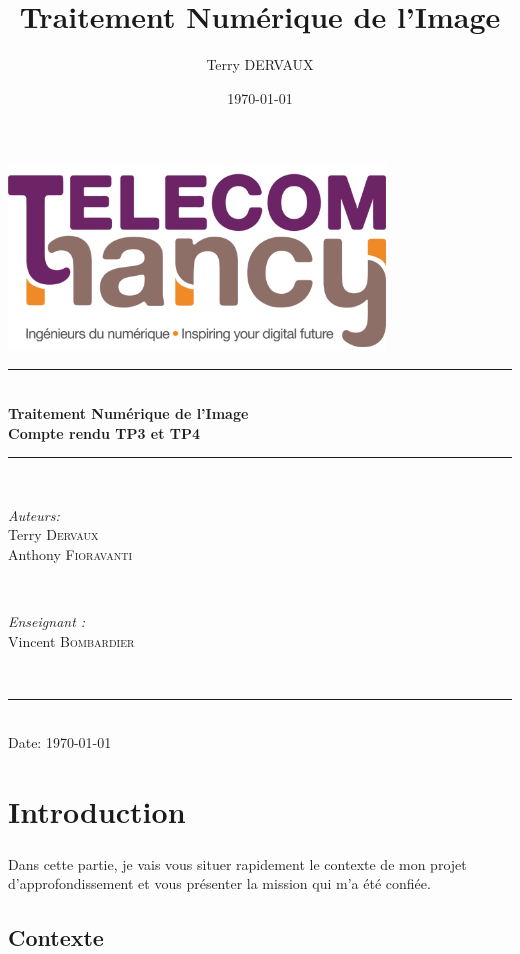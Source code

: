 \documentclass[a4paper,titlepage]{report}
\title{Traitement Numérique de l'Image}
\author{Terry \textsc{DERVAUX}}
\date{\today} %
\newcommand{\HRule}{\rule{\linewidth}{0.5mm}}
\newcommand{\Title}{Traitement Numérique de l'Image\xspace}
\begin{document}
	\begin{titlepage}
		\center
		\includegraphics[width = 100mm]{./images/logo_telecom_nancy.png}
		\HRule \\[0.4cm]
		{\huge \bfseries \Title}\\[0.4cm]
		{ \bfseries Compte rendu TP3 et TP4}\\[0.4cm]
		\HRule \\[1.5cm]
		
		\begin{minipage}[t]{0.45\textwidth}
			\begin{flushleft} \large
				\emph{Auteurs:}\\
				Terry \textsc{Dervaux}\\
				Anthony \textsc{Fioravanti}\\
			\end{flushleft}
		\end{minipage}
		~
		\begin{minipage}[t]{0.45\textwidth}
			
			\begin{flushright} \large
				\emph{Enseignant :}\\
				Vincent \textsc{Bombardier}\\
			\end{flushright}
			
			
		\end{minipage}\\[1.5cm]
		\HRule \\[1.5cm]
		
		Date: \today\\
		
		\vfill
	\end{titlepage}
	
	\tableofcontents
	
	\chapter{Introduction}
		\paragraph{}
		Dans cette partie, je vais vous situer rapidement le contexte de mon projet d'approfondissement et vous présenter la mission qui m'a été confiée.
		\section{Contexte}
		
	
	\listoffigures	
	
	\printglossaries
	
	
	\printbibliography
	
\end{document}

